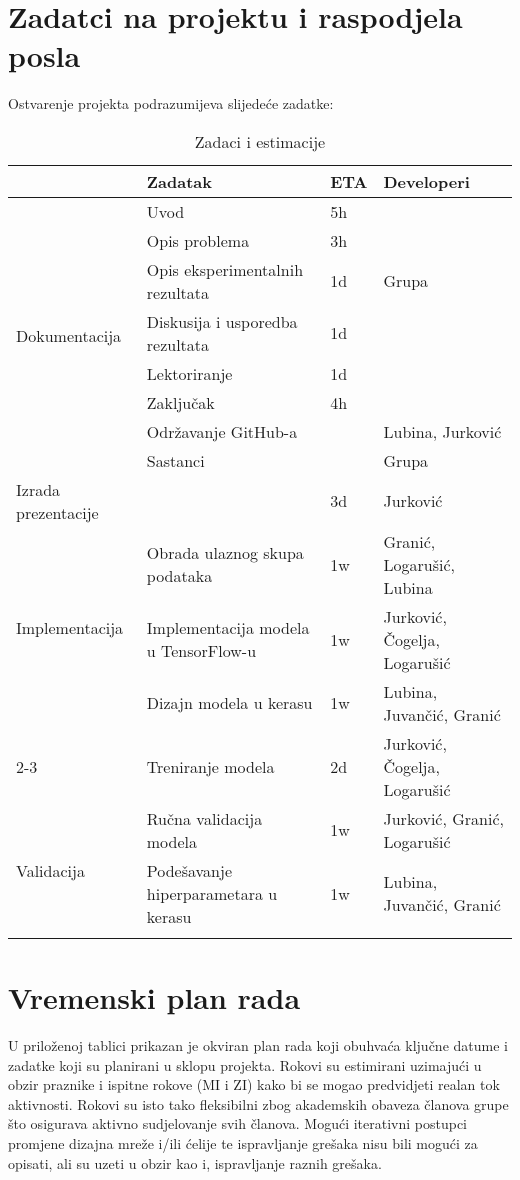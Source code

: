\documentclass{report}
\begin{document}
\section{Zadatci na projektu i raspodjela posla}
Ostvarenje projekta podrazumijeva slijedeće zadatke:
\begin{longtable}{|p{100pt}| p{110pt} |p{20pt}| p{80pt}|}
\hline
 & \textbf{Zadatak} & \textbf{ETA} & \textbf{Developeri}\\
\hline
\multirow{8}{*}{Dokumentacija} & Uvod & 5h \\ \cline{3-3}
 & Opis problema & 3h \\ \cline{2-3}
 & Opis eksperimentalnih rezultata & 1d & Grupa \\ \cline{2-3}
 & Diskusija i usporedba rezultata & 1d \\ \cline{2-3}
 & Lektoriranje & 1d \\ \cline{2-3}
 & Zaključak & 4h \\ \hline
\multirow{2}{*}{Administrativni poslovi} & Održavanje GitHub-a & & Lubina, Jurković\\ \cline{2-3} & Sastanci & & Grupa \\ \hline
\multirow{1}{*}{Izrada prezentacije} &  & 3d & Jurković \\ \hline
\multirow{3}{*}{Implementacija} & Obrada ulaznog skupa podataka & 1w & Granić,  Logarušić, Lubina \\ \cline{2-3}
& Implementacija modela u TensorFlow-u & 1w & Jurković, Čogelja, Logarušić \\ \hline
& Dizajn modela u kerasu & 1w & Lubina, Juvančić, Granić \\ \cline{2-3}
\multirow{2}{*}{Treniranje}
 & Treniranje modela & 2d & Jurković, Čogelja, Logarušić\\ \hline
\multirow{3}{*}{Validacija} & Ručna validacija modela & 1w & Jurković, Granić,  Logarušić\\ \cline{2-3} 
 & Podešavanje hiperparametara u kerasu & 1w & Lubina, Juvančić, Granić  \\ \hline 
 
\caption{Zadaci i estimacije}

\end{longtable}

\section{Vremenski plan rada}

U priloženoj tablici prikazan je okviran plan rada koji obuhvaća ključne datume i zadatke koji su planirani u sklopu projekta. Rokovi su estimirani uzimajući u obzir praznike i ispitne rokove (MI i ZI) kako bi se mogao predvidjeti realan tok aktivnosti. Rokovi su isto tako fleksibilni zbog akademskih obaveza članova grupe što osigurava aktivno sudjelovanje svih članova. Mogući iterativni postupci promjene dizajna mreže i/ili ćelije te ispravljanje grešaka nisu bili mogući za opisati, ali su uzeti u obzir kao i, ispravljanje raznih grešaka.
\end{document}
